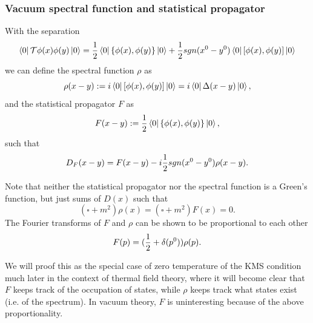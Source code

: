 \subsubsection{Vacuum spectral function and statistical propagator}
\begin{mybox}{}
	With the separation
	\begin{equation*}
		\bra{0}\mathcal{T}\phi (x) \phi(y)  \ket{0} = \frac{1}{2} \bra{0} \{\phi(x),\phi(y) \} \ket{0} + \frac{1}{2} sgn(x^0-y^0) \bra{0} [\phi(x),\phi(y)] \ket{0}
	\end{equation*}
we can define the spectral function $\rho$ as
\begin{equation}
\label{eq:spectralfunction}
\rho(x-y) :=i \bra{0} [\phi(x),\phi(y)] \ket{0} = i \bra{0} \Delta(x-y) \ket{0},
\end{equation}
and the statistical propagator $F$ as
\begin{equation}
	\label{eq:statisicalpropagator}
	F(x-y):= \frac{1}{2} \bra{0} \{\phi(x),\phi(y) \} \ket{0},
\end{equation}
such that
\begin{equation}
	D_F(x-y) = F(x-y) - i\frac{1}{2} sgn(x^0-y^0) \rho(x-y).
\end{equation}
\end{mybox}
Note that neither the statistical propagator nor the spectral function is a Green’s function, but
just sums of $D(x)$ such that
\begin{equation*}
	(\square +m^2) \rho (x) = (\square +m^2 ) F(x) = 0.
\end{equation*}
The Fourier transforms of $F$ and $\rho$ can be shown to be proportional to each other
\begin{equation}
	F (p) = ( \frac{1}{2} + \delta(p^0)) \rho(p) .
\end{equation}

We will proof this as the special case of zero temperature of the KMS condition much later in the
context of thermal field theory, where it will become clear that $F$ keeps track of the occupation
of states, while $\rho$ keeps track what states exist (i.e. of the spectrum). In vacuum theory, $F$ is
uninteresting because of the above proportionality.


